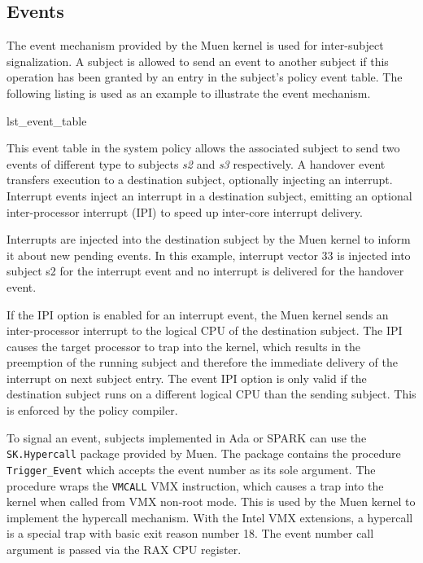 \subsection{Events}\label{subsec:events}
The event mechanism provided by the Muen kernel is used for
inter-subject signalization. A subject is allowed to send an event to another
subject if this operation has been granted by an entry in the subject's policy
event table. The following listing is used as an example to illustrate the
event mechanism.


	{lst_event_table}

This event table in the system policy allows the associated subject to send two
events of different type to subjects \emph{s2} and \emph{s3} respectively. A
handover event transfers execution to a destination subject, optionally
injecting an interrupt.  Interrupt events inject an interrupt in a destination
subject, emitting an optional inter-processor interrupt (IPI) to
speed up inter-core interrupt delivery.

Interrupts are injected into the destination subject by the Muen kernel to
inform it about new pending events. In this example, interrupt vector 33 is
injected into subject s2 for the interrupt event and no interrupt is delivered
for the handover event.

If the IPI option is enabled for an interrupt event, the Muen kernel sends an
inter-processor interrupt to the logical CPU of the destination subject. The
IPI causes the target processor to trap into the kernel, which results in the
preemption of the running subject and therefore the immediate delivery of the
interrupt on next subject entry. The event IPI option is only valid if the
destination subject runs on a different logical CPU than the sending subject.
This is enforced by the policy compiler.

To signal an event, subjects implemented in Ada or SPARK can use the
\texttt{SK.Hypercall} package provided by Muen. The package contains the
procedure \texttt{Trigger\_Event} which accepts the event number as its sole
argument. The procedure wraps the \texttt{VMCALL} VMX instruction, which causes
a trap into the kernel when called from VMX non-root mode. This is used by the
Muen kernel to implement the hypercall mechanism.  With the Intel VMX
extensions, a hypercall is a special trap with basic exit reason number 18. The
event number call argument is passed via the RAX CPU register.

